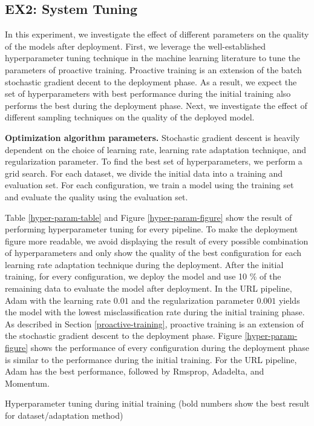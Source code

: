 \subsection{EX2: System Tuning}
In this experiment, we investigate the effect of different parameters on the quality of the models after deployment.
First, we leverage the well-established hyperparameter tuning technique in the machine learning literature to tune the parameters of proactive training.
Proactive training is an extension of the batch stochastic gradient decent to the deployment phase.
As a result, we expect the set of hyperparameters with best performance during the initial training also performs the best during the deployment phase.
Next, we investigate the effect of different sampling techniques on the quality of the deployed model.

\textbf{Optimization algorithm parameters. }
Stochastic gradient descent is heavily dependent on the choice of learning rate, learning rate adaptation technique, and regularization parameter.
To find the best set of hyperparameters, we perform a grid search.
For each dataset, we divide the initial data into a training and evaluation set.
For each configuration, we train a model using the training set and evaluate the quality using the evaluation set.

Table \ref{hyper-param-table} and Figure \ref{hyper-param-figure} show the result of performing hyperparameter tuning for every pipeline.
To make the deployment figure more readable, we avoid displaying the result of every possible combination of hyperparameters and only show the quality of the best configuration for each learning rate adaptation technique during the deployment.
After the initial training, for every configuration, we deploy the model and use 10 \% of the remaining data to evaluate the model after deployment.
In the URL pipeline, Adam with the learning rate $0.01$ and the regularization parameter $0.001$ yields the model with the lowest misclassification rate during the initial training phase.
As described in Section \ref{proactive-training}, proactive training is an extension of the stochastic gradient descent to the deployment phase.
Figure \ref{hyper-param-figure} shows the performance of every configuration during the deployment phase is similar to the performance during the initial training.
For the URL pipeline, Adam has the best performance, followed by Rmsprop, Adadelta, and Momentum.

\begin{table*}[!h]
\centering
\begin{adjustbox}{max width=\textwidth}

\end{adjustbox}
\caption{Hyperparameter tuning during initial training (bold numbers show the best result for dataset/adaptation method)}
\label{hyper-param-table}
\end{table*}

